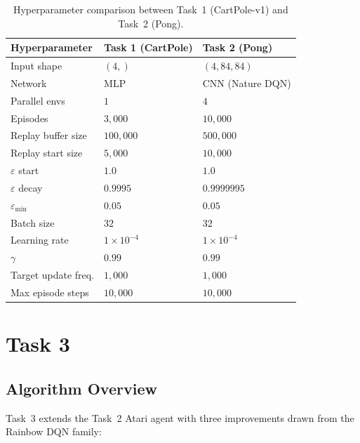 \documentclass[12pt,a4paper]{report}
\begin{document}
\begin{table}[H]
\centering
\caption{Hyperparameter comparison between Task~1 (CartPole-v1) and Task~2 (Pong).}
{\setlength{\tabcolsep}{18pt}
\begin{tabular}{lll}
\toprule
\textbf{Hyperparameter} & \textbf{Task 1 (CartPole)} & \textbf{Task 2 (Pong)} \\
\midrule
Input shape              & $(4,)$            & $(4, 84, 84)$ \\
Network                  & MLP               & CNN (Nature DQN) \\
Parallel envs            & $1$               & $4$ \\
Episodes                 & $3{,}000$         & $10{,}000$ \\
Replay buffer size       & $100{,}000$       & $500{,}000$ \\
Replay start size        & $5{,}000$         & $10{,}000$ \\
$\varepsilon$ start      & $1.0$             & $1.0$ \\
$\varepsilon$ decay      & $0.9995$          & $0.9999995$ \\
$\varepsilon_{\min}$     & $0.05$            & $0.05$ \\
Batch size               & $32$              & $32$ \\
Learning rate            & $1\times10^{-4}$  & $1\times10^{-4}$ \\
$\gamma$                 & $0.99$            & $0.99$ \\
Target update freq.      & $1{,}000$         & $1{,}000$ \\
Max episode steps        & $10{,}000$        & $10{,}000$ \\
\bottomrule
\end{tabular}}
\end{table}

\newpage

\section{Task 3}

\subsection{Algorithm Overview}

Task~3 extends the Task~2 Atari agent with three improvements drawn from the Rainbow DQN family:
\end{document}
